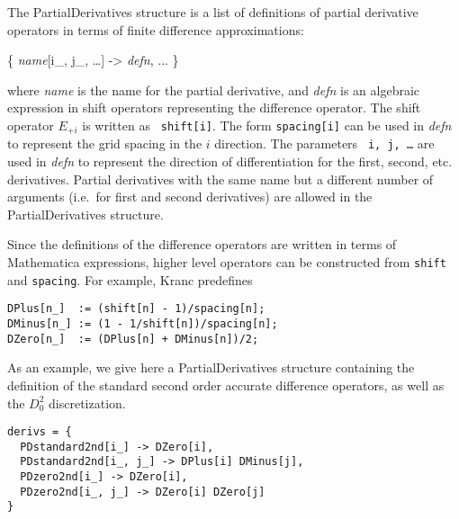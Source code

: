 \documentclass{report}
\begin{document}
The PartialDerivatives structure is a list of definitions of partial
derivative operators in terms of finite difference approximations:

\begin{center}
\begin{minipage}{0.8 \textwidth}
\begin{tt}
\{  {\it name}[i\_, j\_, \ldots] -> {\it defn}, ... \}
\end{tt}
\end{minipage}
\end{center}

where {\it name} is the name for the partial derivative, and {\it
defn} is an algebraic expression in shift operators representing the
difference operator.  The shift operator $E_{+i}$ is written as {\tt
shift[i]}. The form {\tt spacing[i]} can be used in {\it defn} to
represent the grid spacing in the $i$ direction.  The parameters {\tt
i, j, \ldots} are used in {\it defn} to represent the direction of
differentiation for the first, second, etc. derivatives.  Partial
derivatives with the same name but a different number of arguments
(i.e.~for first and second derivatives) are allowed in the
PartialDerivatives structure.

Since the definitions of the difference operators are written in terms
of Mathematica expressions, higher level operators can be constructed
from {\tt shift} and {\tt spacing}.  For example, Kranc predefines

\begin{center}
\begin{minipage}{0.8 \textwidth}
\begin{verbatim}
DPlus[n_]  := (shift[n] - 1)/spacing[n];
DMinus[n_] := (1 - 1/shift[n])/spacing[n];
DZero[n_]  := (DPlus[n] + DMinus[n])/2;
\end{verbatim}
\end{minipage}
\end{center}

As an example, we give here a PartialDerivatives structure containing
the definition of the standard second order accurate difference
operators, as well as the $D_0^2$ discretization.

\begin{center}
\begin{minipage}{0.8 \textwidth}
\begin{verbatim}
derivs = {
  PDstandard2nd[i_] -> DZero[i],
  PDstandard2nd[i_, j_] -> DPlus[i] DMinus[j],
  PDzero2nd[i_] -> DZero[i],
  PDzero2nd[i_, j_] -> DZero[i] DZero[j]
}
\end{verbatim}
\end{minipage}
\end{center}
\end{document}
